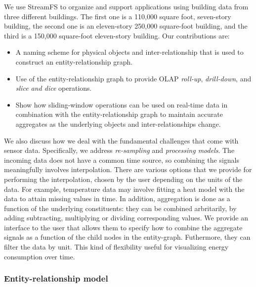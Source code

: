 We use StreamFS to organize and support applications using building data from three different
buildings.  The first one is a 110,000 square foot, seven-story building, the second one is an eleven-story
250,000 square-foot building, and the third is a 150,000 square-foot eleven-story building.
Our contributions are:

\begin{itemize}
\item A naming scheme for physical objects and inter-relationship that is used to construct
		an entity-relationship graph.
\item Use of the entity-relationship graph to provide OLAP \emph{roll-up}, \emph{drill-down},
		and \emph{slice and dice} operations.
\item Show how sliding-window operations can be used on real-time data in combination with the entity-relationship
		graph to maintain accurate aggregates as the underlying objects and inter-relationships change.
\end{itemize}

\vspace{0.08in}

We also discuss how we deal with the fundamental challenges that come with sensor data.  Specifically, we 
address \emph{re-sampling} and \emph{processing models}.  The incoming data does not have a common
time source, so combining the signals meaningfully involves interpolation.  There are various options that we
provide for performing the interpolation, chosen by the user depending on the units of the data.  For example,
temperature data may involve fitting a heat model with the data to attain missing values in time.  In addition,
aggregation is done as a function of the underlying constituents: they can be combined arbritarily, by adding
subtracting, multiplying or dividing corresponding values.  We provide an interface to the user that
allows them to specify how to combine the aggregate signals as a function of the child nodes in the entity-graph.
Futhermore, they can filter the data by unit.  This kind of flexibility useful for visualizing
energy consumption over time.
















\subsubsection{Entity-relationship model}

